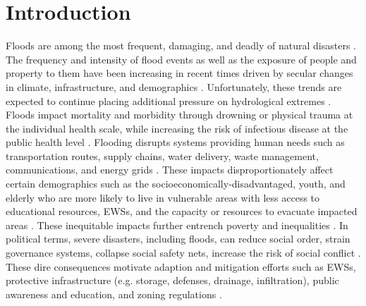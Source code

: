 \documentclass[preprint,review,12pt]{dependencies/elsarticle}
\begin{document}
\section{Introduction}
\label{sec:introduction}
%
\acresetall 
%
Floods are among the most frequent, damaging, and deadly of natural disasters \citep{doocy2013human,stromberg2007natural,kahn2005death}. 
The frequency and intensity of flood events as well as the exposure of people and property to them have been increasing in recent times driven by secular changes in climate, infrastructure, and demographics \citep{berz2000flood,mallakpour2015changing,downton2005reanalysis,kunkel1999temporal,pielke2000precipitation,corringham2019effect}. 
Unfortunately, these trends are expected to continue placing additional pressure on hydrological extremes \citep{kahn2005death,tabari2020climate,milly2002increasing,wing2018estimates}.
Floods impact mortality and morbidity through drowning or physical trauma at the individual health scale, while increasing the risk of infectious disease at the public health level \citep{jonkman2005global,beinin2012medical,alajo2006cholera,french1983mortality}.
Flooding disrupts systems providing human needs such as transportation routes, supply chains, water delivery, waste management, communications, and energy grids \citep{wijkman2021natural}.
These impacts disproportionately affect certain demographics such as the socioeconomically-disadvantaged, youth, and elderly who are more likely to live in vulnerable areas with less access to educational resources, \acp{EWS}, and the capacity or resources to evacuate impacted areas \citep{kahn2005death,smiley2022social,stromberg2007natural,jonkman2005global,tellman2020using,tellman2021satellite}.
These inequitable impacts further entrench poverty and inequalities \citep{stallings1988conflict,birkmann2010extreme}.
In political terms, severe disasters, including floods, can reduce social order, strain governance systems, collapse social safety nets, increase the risk of social conflict \citep{drury1998disasters,xu2016natural,zahran2009natural}.
These dire consequences motivate adaption and mitigation efforts such as \acp{EWS}, protective infrastructure (e.g. storage, defenses, drainage, infiltration), public awareness and education, and zoning regulations \citep{tumbare2000mitigating,tauhid2018mitigating,charlesworth201115}.
\end{document}
